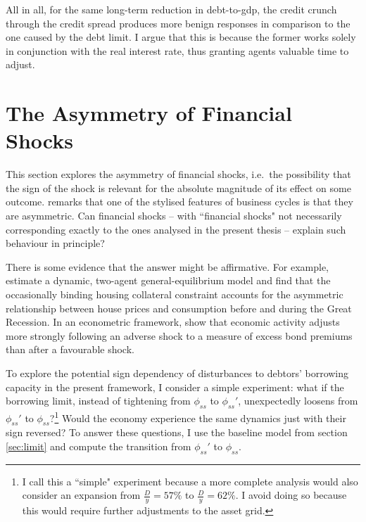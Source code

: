\documentclass[a4paper,12pt]{article} %
\numberwithin{equation}{section} %
\numberwithin{figure}{section}
\numberwithin{table}{section}
\begin{document}
All in all, for the same long-term reduction in debt-to-\Gls{gdp}, the credit crunch through the credit spread produces more benign responses in comparison to the one caused by the debt limit. I argue that this is because the former works solely in conjunction with the real interest rate, thus granting agents valuable time to adjust.

\section{The Asymmetry of Financial Shocks}
\label{sec:asymmetry}

This section explores the asymmetry of financial shocks, i.e.~the possibility that the sign of the
shock is relevant for the absolute magnitude of its effect on some outcome. \textcite{kocherlakota2000} remarks that one of the stylised features of business cycles is that they are asymmetric. Can financial shocks -- with ``financial shocks" not necessarily corresponding exactly to the ones analysed in the present thesis -- explain such behaviour in principle? 

There is some evidence that the answer might be affirmative. For example, \textcite{guerrieri2017asym} estimate a dynamic, two-agent general-equilibrium model and find that the occasionally binding housing collateral constraint accounts for the asymmetric relationship between house prices and consumption before and during the Great Recession. In an econometric framework, \textcite{barnichon2022} show that economic activity adjusts more strongly following an adverse shock to a measure of excess bond premiums than after a favourable shock.

To explore the potential sign dependency of disturbances to debtors' borrowing capacity in the present framework, I consider a simple experiment: what if the borrowing limit, instead of tightening from $\phi_{ss}$ to $\phi_{ss}'$, unexpectedly loosens from $\phi_{ss}'$ to $\phi_{ss}$?\footnote{I call this a ``simple" experiment because a more complete analysis would also consider an expansion from $\frac{D}{y} = 57\%$ to $\frac{D}{y} = 62\%$. I avoid doing so because this would require further adjustments to the asset grid.} Would the economy experience the same dynamics just with their sign reversed? To answer these questions, I use the baseline model from section \ref{sec:limit} and compute the transition from $\phi_{ss}'$ to $\phi_{ss}$.
\end{document}
